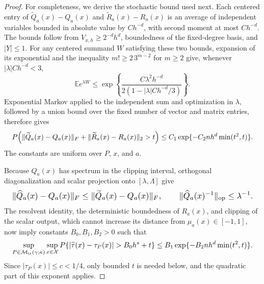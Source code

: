 \documentclass{article}
\begin{document}
\begin{proof}
For completeness, we derive the stochastic bound used next. Each centered entry of \(\widetilde Q_a(x)-Q_a(x)\) and \(\widetilde R_a(x)-R_a(x)\) is an average of independent variables bounded in absolute value by \(C h^{-d}\), with second moment at most \(C h^{-d}\). The bounds follow from \(V_{x,h}\ge2^{-d}h^d\), boundedness of the fixed-degree basis, and \(|Y|\le1\). For any centered summand \(W\) satisfying these two bounds, expansion of its exponential and the inequality \(m!\ge2\,3^{m-2}\) for \(m\ge2\) give, whenever \(|\lambda|Ch^{-d}<3\),
\[
\mathbb E e^{\lambda W}
\le\exp\!\left\{
\frac{C\lambda^2h^{-d}}{2(1-|\lambda|Ch^{-d}/3)}
\right\}.
\]
Exponential Markov applied to the independent sum and optimization in \(\lambda\), followed by a union bound over the fixed number of vector and matrix entries, therefore gives
\[
\makebox[\linewidth][c]{\resizebox{0.98\linewidth}{!}{\(\displaystyle P\!\left(
\|\widetilde Q_a(x)-Q_a(x)\|_F
+\|\widetilde R_a(x)-R_a(x)\|_2>t
\right)
\le C_1\exp\{-C_2nh^d\min(t^2,t)\}.\)}}
\]
The constants are uniform over \(P\), \(x\), and \(a\).

Because \(Q_a(x)\) has spectrum in the clipping interval, orthogonal diagonalization and scalar projection onto \([\lambda,\Lambda]\) give
\[
\makebox[\linewidth][c]{\resizebox{0.98\linewidth}{!}{\(\displaystyle \|\widehat Q_a(x)-Q_a(x)\|_F
\le\|\widetilde Q_a(x)-Q_a(x)\|_F,
\qquad
\|\widehat Q_a(x)^{-1}\|_{\mathrm{op}}\le\lambda^{-1}.\)}}
\]
The resolvent identity, the deterministic boundedness of \(R_a(x)\), and clipping of the scalar output, which cannot increase its distance from \(\mu_a(x)\in[-1,1]\), now imply constants \(B_0,B_1,B_2>0\) such that
\[
\makebox[\linewidth][c]{\resizebox{0.98\linewidth}{!}{\(\displaystyle \sup_{P\in\mathcal M_{\mathrm{tr}}(\gamma;\kappa)}
\sup_{x\in\mathcal X}
P\{ |\widehat\tau(x)-\tau_P(x)|>B_0h^s+t\}
\le B_1\exp\{-B_2nh^d\min(t^2,t)\}.\)}}
\]
Since \(|\tau_P(x)|\le c<1/4\), only bounded \(t\) is needed below, and the quadratic part of this exponent applies.


\end{proof}
\end{document}
